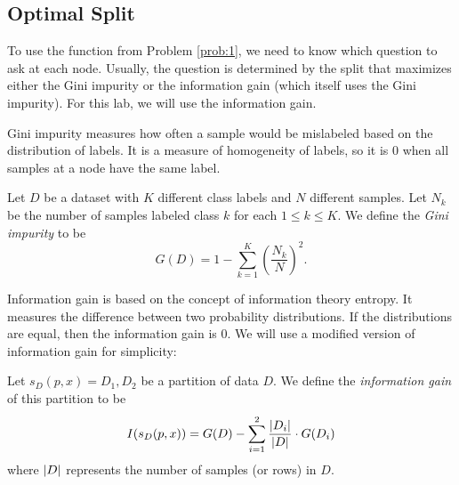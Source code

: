 \subsection*{Optimal Split}
To use the  function from Problem \ref{prob:1}, we need to know which question to ask at each node. 
Usually, the question is determined by the split that maximizes either the Gini impurity or the information gain (which itself uses the Gini impurity).
For this lab, we will use the information gain.

Gini impurity measures how often a sample would be mislabeled based on the distribution of labels.
It is a measure of homogeneity of labels, so it is $0$ when all samples at a node have the same label.

\begin{definition}
Let $D$ be a dataset with $K$ different class labels and $N$ different samples.
Let $N_{k}$ be the number of samples labeled class $k$ for each $1 \leq k \leq K$.
We define the \emph{Gini impurity} to be 
\begin{equation*}
G(D) = 1 - \sum_{k=1}^{K} \left(\frac{N_k}{N}\right)^2.
\end{equation*}
\end{definition}

Information gain is based on the concept of information theory entropy.
It measures the difference between two probability distributions.
If the distributions are equal, then the information gain is $0$.
We will use a modified version of information gain for simplicity:

\begin{definition}
Let $s_{D}(p,x) = D_{1},D_{2}$ be a partition of data $D$.
We define the \emph{information gain} of this partition to be 
\begin{equation*}
I(s_{D}(p,x)) = G(D) - \sum_{i=1}^{2} \frac{\left\lvert D_{i}\right\rvert}{\left\lvert D\right\rvert} \cdot G(D_{i})
\end{equation*}
where $\left\lvert D\right\rvert$ represents the number of samples (or rows) in $D$.
\end{definition}

